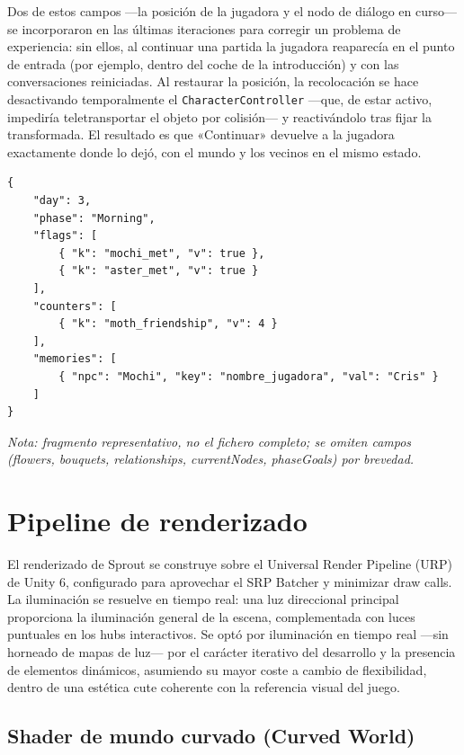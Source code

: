 \documentclass[12pt,twoside,titlepage]{report}
\begin{document}
Dos de estos campos ---la posición de la jugadora y el nodo de diálogo en curso--- se incorporaron en las últimas iteraciones para corregir un problema de experiencia: sin ellos, al continuar una partida la jugadora reaparecía en el punto de entrada (por ejemplo, dentro del coche de la introducción) y con las conversaciones reiniciadas. Al restaurar la posición, la recolocación se hace desactivando temporalmente el \texttt{CharacterController} ---que, de estar activo, impediría teletransportar el objeto por colisión--- y reactivándolo tras fijar la transformada. El resultado es que «Continuar» devuelve a la jugadora exactamente donde lo dejó, con el mundo y los vecinos en el mismo estado.

\begin{lstlisting}[caption={Fragmento representativo de \texttt{sprout\_save.json}, mostrando el aplanamiento de banderas, contadores y memoria de NPC en listas de pares.}, label={cod:save-json}]
{
    "day": 3,
    "phase": "Morning",
    "flags": [
        { "k": "mochi_met", "v": true },
        { "k": "aster_met", "v": true }
    ],
    "counters": [
        { "k": "moth_friendship", "v": 4 }
    ],
    "memories": [
        { "npc": "Mochi", "key": "nombre_jugadora", "val": "Cris" }
    ]
}
\end{lstlisting}
\noindent\textit{Nota: fragmento representativo, no el fichero completo; se omiten campos (flowers, bouquets, relationships, currentNodes, phaseGoals) por brevedad.}
\section{Pipeline de renderizado}

El renderizado de Sprout se construye sobre el Universal Render Pipeline (URP) de Unity 6, configurado para aprovechar el SRP Batcher y minimizar draw calls. La iluminación se resuelve en tiempo real: una luz direccional principal proporciona la iluminación general de la escena, complementada con luces puntuales en los hubs interactivos. Se optó por iluminación en tiempo real ---sin horneado de mapas de luz--- por el carácter iterativo del desarrollo y la presencia de elementos dinámicos, asumiendo su mayor coste a cambio de flexibilidad, dentro de una estética cute coherente con la referencia visual del juego.

\subsection{Shader de mundo curvado (Curved World)}
\end{document}
